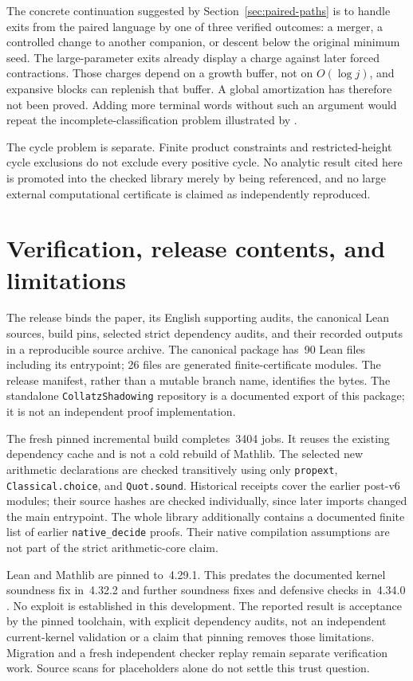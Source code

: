\documentclass[11pt,a4paper]{article}
\theoremstyle{definition}
\begin{document}
The concrete continuation suggested by Section~\ref{sec:paired-paths}
is to handle exits from the paired language by one of three verified
outcomes: a merger, a controlled change to another companion, or
descent below the original minimum seed. The large-parameter exits
already display a charge against later forced contractions. Those
charges depend on a growth buffer, not on $O(\log j)$, and expansive
blocks can replenish that buffer. A global amortization has therefore
not been proved. Adding more terminal words without such an argument
would repeat the incomplete-classification problem illustrated by
\cite{eliatucker2015}.

The cycle problem is separate. Finite product constraints and
restricted-height cycle exclusions do not exclude every positive
cycle. No analytic result cited here is promoted into the checked
library merely by being referenced, and no large external
computational certificate is claimed as independently reproduced.

\section{Verification, release contents, and limitations}
\label{sec:verification}
The release binds the paper, its English supporting audits, the
canonical Lean sources, build pins, selected strict dependency
audits, and their recorded outputs in a reproducible source archive.
The canonical package has~90 Lean files including its entrypoint;
26 files are generated finite-certificate modules. The release
manifest, rather than a mutable branch name, identifies the bytes.
The standalone \texttt{CollatzShadowing} repository is a documented
export of this package; it is not an independent proof implementation.

The fresh pinned incremental build completes~3404 jobs. It reuses
the existing dependency cache and is not a cold rebuild of Mathlib.
The selected new arithmetic declarations are checked transitively
using only \texttt{propext}, \texttt{Classical.choice}, and
\texttt{Quot.sound}. Historical receipts cover the earlier post-v6
modules; their source hashes are checked individually, since later
imports changed the main entrypoint. The whole library additionally
contains a documented finite list of earlier \texttt{native\_decide}
proofs. Their native compilation assumptions are not part of the
strict arithmetic-core claim.

Lean and Mathlib are pinned to~4.29.1. This predates the documented
kernel soundness fix in~4.32.2 and further soundness fixes and defensive
checks in~4.34.0 \cite{lean4322,lean4340}. No exploit is established
in this development. The reported result is acceptance by the pinned
toolchain, with explicit dependency audits, not an independent
current-kernel validation or a claim that pinning removes those
limitations. Migration and a fresh independent checker replay remain
separate verification work. Source scans for placeholders alone do
not settle this trust question.
\end{document}

